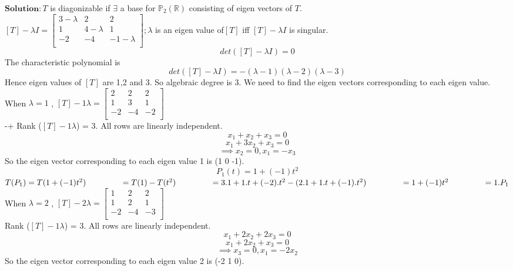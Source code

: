 \documentclass[12pt]{article}
\theoremstyle{definition}
\begin{document}
	$\mathbf{Solution:}$$ T $ is diagonizable if $ \exists $ a base for $ \mathbb{P}_{2}(\mathbb{R}) $	consisting of eigen vectors of $ T $.\\
	$[ T ]- \lambda I =\begin{bmatrix}
    3-\lambda&2&2\\
    1&4-\lambda&1\\
    -2&-4&-1-\lambda\\ 
    \end{bmatrix}
	;\lambda$ is an eigen value of$ [T] $ iff $ [T]-\lambda I $ is singular.$$ det([T]-\lambda I)=0 $$
	The characteristic polynomial  is $$ det([T]-\lambda I)=-(\lambda-1)(\lambda-2)(\lambda-3)$$
	Hence eigen values of $ [T] $ are 1,2 and 3. So algebraic degree is 3. We need to find the eigen vectors corresponding to each eigen value.\\
	When $ \lambda=1 $ , $ [T]-1\lambda=
		\begin{bmatrix}
	2&2&2\\
	1&3&1\\
	-2&-4&-2\\
	\end{bmatrix}
	 $\\-+
	 Rank  ($[T]-1\lambda  $) = 3. All rows are linearly independent.
	$$ x_{1}+x_{2}+x_{3}=0 $$
	$$ x_{1}+3x_{2}+x_{3}=0 $$
	$$\implies x_{2}=0 , x_{1}=-x_{3}$$
	So the eigen vector corresponding to each eigen value 1 is (1 0 -1).
	$$ P_{1}(t)=1+(-1)t^2 $$
	$ T(P_{1})=T(1+(-1)t^2) \\         
	\hspace*{1.5cm}=T(1)-T(t^2)\\
	\hspace*{1.5cm}=3.1+1.t+(-2).t^2-(2.1+1.t+(-1).t^2)\\
	\hspace*{1.5cm}=1+(-1)t^2 \\
	\hspace*{1.5cm}=1.P_{1}\\
	$
	When $ \lambda=2 $ , $ [T]-2\lambda=
	\begin{bmatrix}
	1&2&2\\
	1&2&1\\
	-2&-4&-3\\
	\end{bmatrix}
	$\\
	Rank  ($[T]-1\lambda  $) = 3. All rows are linearly independent.
	$$ x_{1}+2x_{2}+2x_{3}=0 $$
	$$ x_{1}+2x_{2}+x_{3}=0 $$
	$$\implies x_{3}=0 , x_{1}=-2x_{2}$$
	So the eigen vector corresponding to each eigen value 2 is (-2 1 0).
$$
\end{document}
